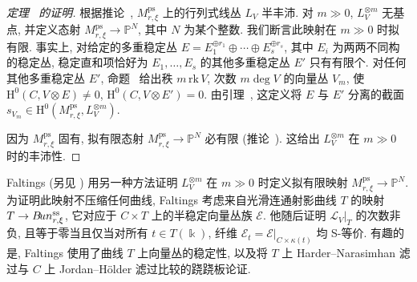 \begin{proof}[定理~ 的证明]
根据推论~, $M_{r,\xi}^{\mathrm{ps}}$ 上的行列式线丛 $L_V$ 半丰沛. 对 $m\gg0$, $L_V^{\otimes m}$ 无基点, 并定义态射 $M_{r,\xi}^{\mathrm{ps}}\to\mathbb P^N$, 其中 $N$ 为某个整数. 我们断言此映射在 $m\gg0$ 时拟有限. 事实上, 对给定的多重稳定丛 $E=E_1^{\oplus r_1}\oplus\cdots\oplus E_s^{\oplus r_s}$, 其中 $E_i$ 为两两不同构的稳定丛, 稳定直和项恰好为 $E_1,\ldots,E_s$ 的其他多重稳定丛 $E'$ 只有有限个. 对任何其他多重稳定丛 $E'$, 命题~ 给出秩 $m\,\mathrm{rk}\,V$, 次数 $m\deg V$ 的向量丛 $V_m$, 使 $\mathrm H^0(C,V\otimes E)\neq0$, $\mathrm H^0(C,V\otimes E')=0$. 由引理~, 这定义将 $E$ 与 $E'$ 分离的截面 $s_{V_m}\in\mathrm H^0(M_{r,\xi}^{\mathrm{ps}},L_V^{\otimes m})$.

因为 $M_{r,\xi}^{\mathrm{ps}}$ 固有, 拟有限态射 $M_{r,\xi}^{\mathrm{ps}}\to\mathbb P^N$ 必有限 (推论~). 这给出 $L_V^{\otimes m}$ 在 $m\gg0$ 时的丰沛性.
\end{proof}
\begin{remark}\label{src:9.6.13}
Faltings \cite[定理 I.4]{Fal93} (另见 \cite[引理 4.2]{Ses93}) 用另一种方法证明 $L_V^{\otimes m}$ 在 $m\gg0$ 时定义拟有限映射 $M_{r,\xi}^{\mathrm{ps}}\to\mathbb P^N$. 为证明此映射不压缩任何曲线, Faltings 考虑来自光滑连通射影曲线 $T$ 的映射 $T\to B\!un_{r,\xi}^{\mathrm{ss}}$, 它对应于 $C\times T$ 上的半稳定向量丛族 $\mathcal E$. 他随后证明 $\mathcal L_V|_T$ 的次数非负, 且等于零当且仅当对所有 $t\in T(\Bbbk)$, 纤维 $\mathcal E_t=\mathcal E|_{C\times\kappa(t)}$ 均 S-等价. 有趣的是, Faltings 使用了曲线 $T$ 上向量丛的稳定性, 以及将 $T$ 上 Harder--Narasimhan 滤过与 $C$ 上 Jordan--H\"older 滤过比较的跷跷板论证.
\end{remark}

